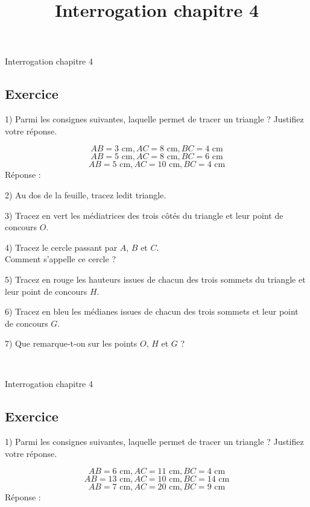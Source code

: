 \documentclass[14pt]{extreport}
\title{Interrogation chapitre 4}
\date{}
\theoremstyle{plain}
\begin{document}
\begin{center}{\Large Interrogation chapitre 4}\end{center}

\subsection*{Exercice}

1) Parmi les consignes suivantes, laquelle permet de tracer un triangle ? Justifiez votre réponse. 

\[ AB = 3\text{ cm}, AC=8\text{ cm},BC = 4\text{ cm}\]
\[ AB = 5\text{ cm}, AC=8\text{ cm},BC = 6\text{ cm}\]
\[ AB = 5\text{ cm}, AC=10\text{ cm},BC = 4\text{ cm}\]
Réponse : \dotfill

\dotfill

\dotfill

2) Au dos de la feuille, tracez ledit triangle. 

3) Tracez en vert les médiatrices des trois côtés du triangle et leur point de concours $O$. 

4) Tracez le cercle passant par $A$, $B$ et $C$. \\Comment s'appelle ce cercle ? \dotfill 

5) Tracez en rouge les hauteurs issues de chacun des trois sommets du triangle et leur point de concours $H$. 

6) Tracez en bleu les médianes issues de chacun des trois sommets et leur point de concours $G$. 

7) Que remarque-t-on sur les points $O$, $H$ et $G$ ? \dotfill 

 \  \dotfill
 
 \newpage 
 

\begin{center}{\Large Interrogation chapitre 4}\end{center}

 
 
\subsection*{Exercice}

1) Parmi les consignes suivantes, laquelle permet de tracer un triangle ? Justifiez votre réponse. 

\[ AB = 6\text{ cm}, AC= 11\text{ cm},BC = 4\text{ cm}\]
\[ AB = 13\text{ cm}, AC=10 \text{ cm},BC = 14\text{ cm}\]
\[ AB = 7\text{ cm}, AC=20\text{ cm},BC = 9\text{ cm}\]
Réponse : \dotfill

\dotfill
\end{document}
